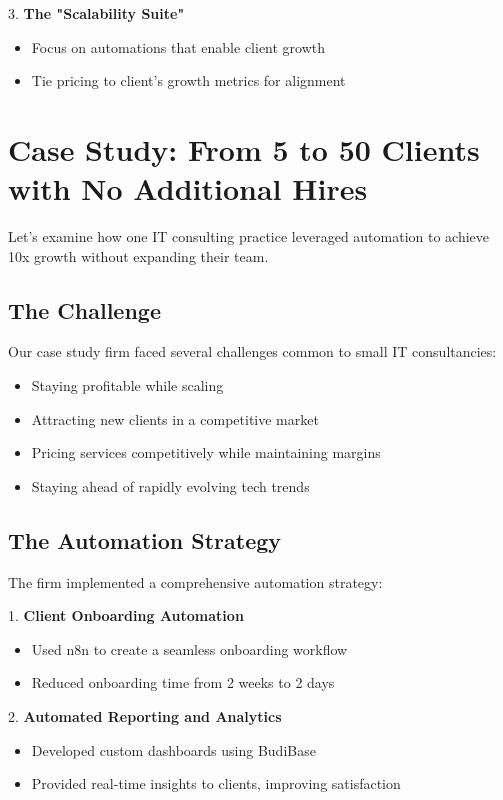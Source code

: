 3. \textbf{The "Scalability Suite"}
\begin{itemize}
    \item Focus on automations that enable client growth
    \item Tie pricing to client's growth metrics for alignment
\end{itemize}


\section{Case Study: From 5 to 50 Clients with No Additional Hires}

Let's examine how one IT consulting practice leveraged automation to achieve 10x growth without expanding their team.

\subsection{The Challenge}

Our case study firm faced several challenges common to small IT consultancies:
\begin{itemize}
    \item Staying profitable while scaling
    \item Attracting new clients in a competitive market
    \item Pricing services competitively while maintaining margins
    \item Staying ahead of rapidly evolving tech trends
\end{itemize}

\subsection{The Automation Strategy}

The firm implemented a comprehensive automation strategy:

1. \textbf{Client Onboarding Automation}
\begin{itemize}
    \item Used n8n to create a seamless onboarding workflow
    \item Reduced onboarding time from 2 weeks to 2 days
\end{itemize}

2. \textbf{Automated Reporting and Analytics}
\begin{itemize}
    \item Developed custom dashboards using BudiBase
    \item Provided real-time insights to clients, improving satisfaction
\end{itemize}

